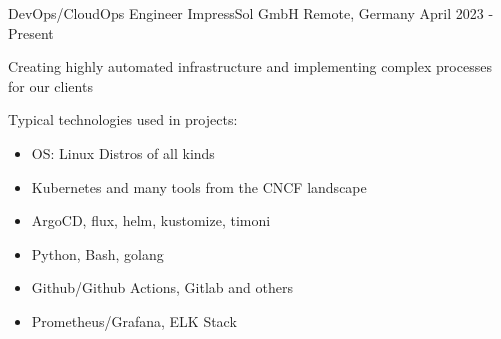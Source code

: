 \begin{cventries}

  \cventry
    {DevOps/CloudOps Engineer} %
    {ImpressSol GmbH} %
    {Remote, Germany} %
    {April 2023 - Present} %
    {
      \begin{cvitems} %
        \item Creating highly automated infrastructure and implementing complex processes for our clients
        \item Typical technologies used in projects:
          \begin{itemize}
            \item OS: Linux Distros of all kinds
            \item Kubernetes and many tools from the CNCF landscape
            \item ArgoCD, flux, helm, kustomize, timoni
            \item Python, Bash, golang
            \item Github/Github Actions, Gitlab and others
            \item Prometheus/Grafana, ELK Stack
          \end{itemize}
      \end{cvitems}
    }


\end{cventries}
